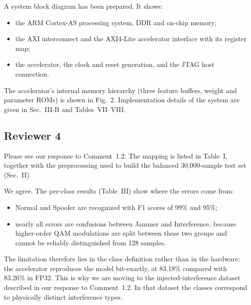 \documentclass[10pt,a4paper]{article}
\begin{document}
A system block diagram has been prepared. It shows:
\begin{itemize}
  \item the ARM Cortex-A9 processing system, DDR and on-chip memory;
  \item the AXI interconnect and the AXI4-Lite accelerator interface with its register map;
  \item the accelerator, the clock and reset generation, and the JTAG host connection.
\end{itemize}
The accelerator's internal memory hierarchy (three feature buffers, weight and parameter ROMs)
is shown in Fig.~2. Implementation details of the system are given in Sec.~III-B and
Tables~VII--VIII.

\subsection*{Reviewer 4}

Please see our response to Comment~1.2. The mapping is listed in Table~I, together with the
preprocessing used to build the balanced 30,000-sample test set (Sec.~II).

We agree. The per-class results (Table~III) show where the errors come from:
\begin{itemize}
  \item Normal and Spoofer are recognized with F1 scores of 99\% and 95\%;
  \item nearly all errors are confusions between Jammer and Interference, because higher-order QAM
  modulations are split between these two groups and cannot be reliably distinguished from 128
  samples.
\end{itemize}
The limitation therefore lies in the class definition rather than in the hardware: the
accelerator reproduces the model bit-exactly, at 83.18\% compared with 83.26\% in FP32. This is
why we are moving to the injected-interference dataset described in our response to
Comment~1.2. In that dataset the classes correspond to physically distinct interference types.
\end{document}
